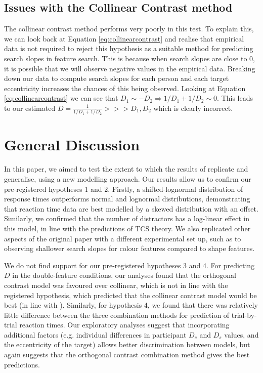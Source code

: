 \documentclass[preprint,12pt,authoryear]{elsarticle}
\begin{document}
\subsection{Issues with the Collinear Contrast method}
The collinear contrast method performs very poorly in this test. To explain this, we can look back at Equation \ref{eq:collinearcontrast} and realise that empirical data is not required to reject this hypothesis as a suitable method for predicting search slopes in feature search. This is because when search slopes are close to 0, it is possible that we will observe negative values in the empirical data. Breaking down our data to compute search slopes for each person and each target eccentricity increases the chances of this being observed. Looking at Equation \ref{eq:collinearcontrast} we can see that $D_1 \sim -D_2\Rightarrow 1/D_1 + 1/D_2 \sim 0$. This leads to our estimated $D = \frac{1}{1/D_1 + 1/D_2} >>> D_1, D_2$ which is clearly incorrect. 

\section{General Discussion}

In this paper, we aimed to test the extent to which the results of \cite{buetti2019predicting} replicate and generalise, using a new modelling approach. Our results allow us to confirm our pre-registered hypotheses 1 and 2. Firstly, a shifted-lognormal distribution of response times outperforms normal and lognormal distributions, demonstrating that reaction time data are best modelled by a skewed distribution with an offset. Similarly, we confirmed that the number of distractors has a log-linear effect in this model, in line with the predictions of TCS theory. We also replicated other aspects of the original \cite{buetti2019predicting} paper with a different experimental set up, such as to observing shallower search slopes for colour features compared to shape features.

We do not find support for our pre-registered hypotheses 3 and 4. For predicting $D$ in the double-feature conditions, our analyses found that the orthogonal contrast model was favoured over collinear, which is not in line with the registered hypothesis, which predicted that the collinear contrast model would be best (in line with \cite{buetti2019predicting}). Similarly, for hypothesis 4, we found that there was relatively little difference between the three combination methods for prediction of trial-by-trial reaction times. Our exploratory analyses suggest that incorporating additional factors (e.g. individual differences in participant $D_c$ and $D_s$ values, and the eccentricity of the target) allows better discrimination between models, but again suggests that the orthogonal contrast combination method gives the best predictions.
\end{document}
